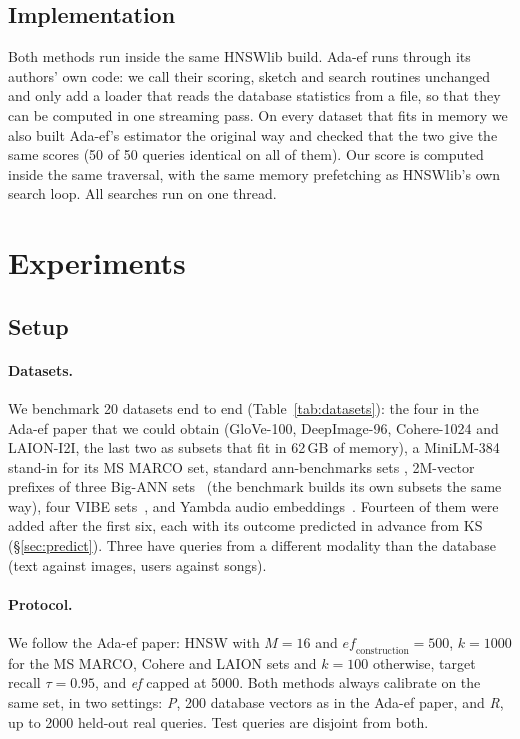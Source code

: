 \documentclass[sigconf,anonymous]{acmart}
\newcommand{\ef}{\textit{ef}}
\begin{document}
\subsection{Implementation}

Both methods run inside the same HNSWlib build. Ada-ef runs through its authors' own code: we call
their scoring, sketch and search routines unchanged and only add a loader that reads the database
statistics from a file, so that they can be computed in one streaming pass. On every dataset that
fits in memory we also built Ada-ef's estimator the original way and checked that the two give the
same scores (50 of 50 queries identical on all of them). Our score is computed inside the same
traversal, with the same memory prefetching as HNSWlib's own search loop. All searches run on one
thread.

\section{Experiments}

\subsection{Setup}

\paragraph{Datasets.}
We benchmark 20 datasets end to end (Table~\ref{tab:datasets}): the four in the Ada-ef paper that
we could obtain (GloVe-100, DeepImage-96, Cohere-1024 and LAION-I2I, the last two as subsets that
fit in 62\,GB of memory), a MiniLM-384 stand-in for its MS MARCO set, standard ann-benchmarks sets
\cite{aumuller2020annbenchmarks}, 2M-vector prefixes of three Big-ANN sets~\cite{simhadri2022bigann}
(the benchmark builds its own subsets the same way), four VIBE sets~\cite{jaasaari2025vibe}, and
Yambda audio embeddings~\cite{ploshkin2025yambda}. Fourteen of them were added after the first six,
each with its outcome predicted in advance from KS (\S\ref{sec:predict}). Three have queries from a
different modality than the database (text against images, users against songs).

\paragraph{Protocol.}
We follow the Ada-ef paper: HNSW with $M = 16$ and $\mathit{ef}_{\mathrm{construction}} = 500$,
$k = 1000$ for the MS MARCO, Cohere and LAION sets and $k = 100$ otherwise, target recall
$\tau = 0.95$, and \ef{} capped at 5000. Both methods always calibrate on the same set, in two
settings: \emph{P}, 200 database vectors as in the Ada-ef paper, and \emph{R}, up to 2000 held-out
real queries. Test queries are disjoint from both.
\end{document}
